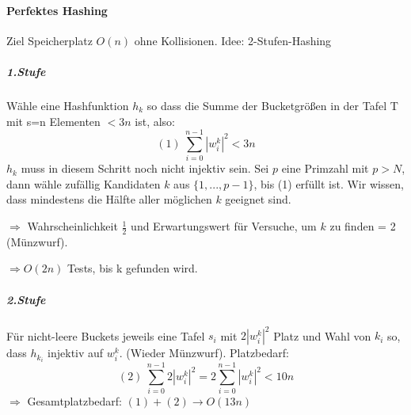 \paragraph{Perfektes Hashing} Ziel Speicherplatz $ O(n) $ ohne Kollisionen. Idee: 2-Stufen-Hashing

\subparagraph{1.Stufe} Wähle eine Hashfunktion $ h_k $ so dass die Summe der Bucketgrößen in der Tafel T mit s=n Elementen $ < 3n $ ist, also:
\[ (1)\ \sum_{i=0}^{n-1} |w_i^k|^2 < 3n\]
$ h_k $ muss in diesem Schritt noch nicht injektiv sein. Sei $ p $ eine Primzahl mit $ p>N $, dann wähle zufällig Kandidaten $ k $ aus $\{1,...,p-1\}$, bis (1) erfüllt ist. Wir wissen, dass mindestens die Hälfte aller möglichen $ k $ geeignet sind. 

$ \Rightarrow $ Wahrscheinlichkeit $ \frac{1}{2} $ und Erwartungswert für Versuche, um $ k $ zu finden = 2 (Münzwurf).

$ \Rightarrow O(2n)$ Tests, bis k gefunden wird.

\subparagraph{2.Stufe} Für nicht-leere Buckets jeweils eine Tafel $ s_i $ mit $ 2|w_i^k|^2 $ Platz und Wahl von $ k_i $ so, dass $ h_{k_i} $ injektiv auf $ w_i^k $. (Wieder Münzwurf). Platzbedarf: 
\[ (2)\ \sum_{i=0}^{n-1} 2|w_i^k|^2 = 2\sum_{i=0}^{n-1} |w_i^k|^2 < 10n \]
$ \Rightarrow $ Gesamtplatzbedarf: $ (1) + (2) \rightarrow O(13n)$ 






















